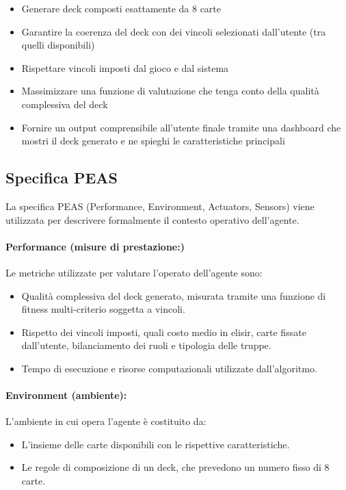 \documentclass{article}
\begin{document}
\begin{itemize}
  \item Generare deck composti esattamente da 8 carte 
  \item Garantire la coerenza del deck con dei vincoli selezionati dall’utente (tra quelli disponibili)
  \item Rispettare vincoli imposti dal gioco e dal sistema
  \item Massimizzare una funzione di valutazione che tenga conto della qualità complessiva del deck 
  \item Fornire un output comprensibile all’utente finale tramite una dashboard che mostri il deck generato e ne spieghi le caratteristiche principali
\end{itemize}

\subsection{Specifica PEAS}

La specifica PEAS (Performance, Environment, Actuators, Sensors) viene utilizzata per descrivere formalmente il contesto operativo dell’agente.

\paragraph{Performance (misure di prestazione:)}
Le metriche utilizzate per valutare l’operato dell’agente sono:
\begin{itemize}
    \item Qualità complessiva del deck generato, misurata tramite una funzione di fitness multi-criterio soggetta a vincoli.
    \item Rispetto dei vincoli imposti, quali costo medio in elisir, carte fissate dall’utente, bilanciamento dei ruoli e tipologia delle truppe.
    \item Tempo di esecuzione e risorse computazionali utilizzate dall’algoritmo.
\end{itemize}

\paragraph{Environment (ambiente):}
L’ambiente in cui opera l’agente è costituito da:
\begin{itemize}
    \item L’insieme delle carte disponibili con le rispettive caratteristiche.
    \item Le regole di composizione di un deck, che prevedono un numero fisso di 8 carte.
\end{itemize}
\end{document}
